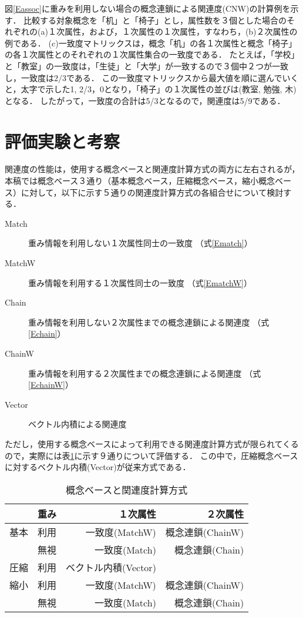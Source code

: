 図\ref{Eassoc}に重みを利用しない場合の概念連鎖による関連度(CNW)の計算例を示す．
比較する対象概念を「机」と「椅子」とし，属性数を３個とした場合のそれぞれの(a)１次属性，および，１次属性の１次属性，すなわち，(b)２次属性の例である．
(c)一致度マトリックスは，概念「机」の各１次属性と概念「椅子」の各１次属性とのそれぞれの１次属性集合の一致度である．
たとえば，「学校」と「教室」の一致度は，「生徒」と「大学」が一致するので３個中２つが一致し，一致度は$2/3$である．
この一致度マトリックスから最大値を順に選んでいくと，太字で示した1, 2/3，0となり，「椅子」の１次属性の並びは(教室, 勉強, 木)となる．
したがって，一致度の合計は5/3となるので，関連度は5/9である．

\section{評価実験と考察}

関連度の性能は，使用する概念ベースと関連度計算方式の両方に左右されるが，本稿では概念ベース３通り（基本概念ベース，圧縮概念ベース，縮小概念ベース）に対して，以下に示す５通りの関連度計算方式の各組合せについて検討する．
\begin{description}
	\item[Match] 重み情報を利用しない１次属性同士の一致度 （式\ref{Ematch}）
	\item[MatchW] 重み情報を利用する１次属性同士の一致度 （式\ref{EmatchW}）
	\item[Chain] 重み情報を利用しない２次属性までの概念連鎖による関連度 （式\ref{Echain}）
	\item[ChainW] 重み情報を利用する２次属性までの概念連鎖による関連度 （式\ref{EchainW}）
	\item[Vector] ベクトル内積による関連度
\end{description}
ただし，使用する概念ベースによって利用できる関連度計算方式が限られてくるので，実際には表\ref{Case}に示す９通りについて評価する．
この中で，圧縮概念ベースに対するベクトル内積(Vector)が従来方式である．

\begin{table}[tb]
\caption[]{概念ベースと関連度計算方式}
\label{Case}
\begin{center}
\begin{tabular}{r|r|r|r}
     & 重み & １次属性             & ２次属性         \\ \hline
基本 & 利用 & 一致度(MatchW)       & 概念連鎖(ChainW) \\ \cline{2-4}
     & 無視 & 一致度(Match)        & 概念連鎖(Chain)  \\ \hline
圧縮 & 利用 & ベクトル内積(Vector) &                  \\ \hline
縮小 & 利用 & 一致度(MatchW)       & 概念連鎖(ChainW) \\ \cline{2-4}
     & 無視 & 一致度(Match)        & 概念連鎖(Chain)  \\
\end{tabular}
\end{center}
\end{table}


